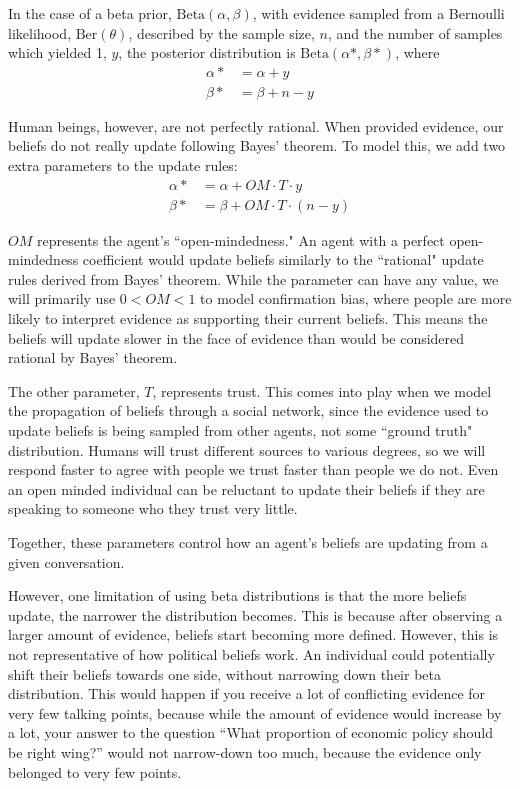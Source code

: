 \documentclass[11pt]{article}
\begin{document}
In the case of a beta prior, $\text{Beta}(\alpha, \beta)$, with evidence sampled from a Bernoulli likelihood, $\text{Ber}(\theta)$, described by the sample size, $n$, and the number of samples which yielded 1, $y$, the posterior distribution is $\text{Beta}(\alpha*,\beta*)$, where 
\begin{align*}
\alpha* &= \alpha + y \\
\beta* &= \beta + n - y
\end{align*}

Human beings, however, are not perfectly rational. When provided evidence, our beliefs do not really update following Bayes' theorem. To model this, we add two extra parameters to the update rules:
\begin{align*}
\alpha* &= \alpha + OM \cdot T \cdot y \\
\beta* &= \beta + OM \cdot T \cdot (n - y)
\end{align*}

$OM$ represents the agent's ``open-mindedness." An agent with a perfect open-mindedness coefficient would update beliefs similarly to the ``rational" update rules derived from Bayes' theorem. While the parameter can have any value, we will primarily use $0 < OM < 1$ to model confirmation bias, where people are more likely to interpret evidence as supporting their current beliefs. This means the beliefs will update slower in the face of evidence than would be considered rational by Bayes' theorem.

The other parameter, $T$, represents trust. This comes into play when we model the propagation of beliefs through a social network, since the evidence used to update beliefs is being sampled from other agents, not some ``ground truth" distribution. Humans will trust different sources to various degrees, so we will respond faster to agree with people we trust faster than people we do not. Even an open minded individual can be reluctant to update their beliefs if they are speaking to someone who they trust very little.

Together, these parameters control how an agent's beliefs are updating from a given conversation.

However, one limitation of using beta distributions is that the more beliefs update, the narrower the distribution becomes. This is because after observing a larger amount of evidence, beliefs start becoming more defined. However, this is not representative of how political beliefs work. An individual could potentially shift their beliefs towards one side, without narrowing down their beta distribution. This would happen if you receive a lot of conflicting evidence for very few talking points, because while the amount of evidence would increase by a lot, your answer to the question  “What proportion of economic policy should be right wing?” would not narrow-down too much, because the evidence only belonged to very few points.
\end{document}
